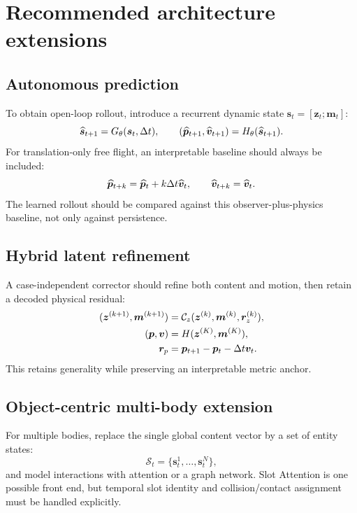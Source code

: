 \documentclass[11pt,a4paper]{article}
\begin{document}
\section{Recommended architecture extensions}
\subsection{Autonomous prediction}
To obtain open-loop rollout, introduce a recurrent dynamic state $\bm s_t=[\bm z_t;\bm m_t]$:
\begin{equation}
\widehat{\bm s}_{t+1}=G_\theta(\bm s_t,\Delta t),\qquad
(\widehat{\bm p}_{t+1},\widehat{\bm v}_{t+1})=H_\theta(\widehat{\bm s}_{t+1}).
\end{equation}
For translation-only free flight, an interpretable baseline should always be included:
\begin{equation}
\widehat{\bm p}_{t+k}=\widehat{\bm p}_t+k\Delta t\widehat{\bm v}_t,
\qquad \widehat{\bm v}_{t+k}=\widehat{\bm v}_t.
\end{equation}
The learned rollout should be compared against this observer-plus-physics baseline, not only against persistence.

\subsection{Hybrid latent refinement}
A case-independent corrector should refine both content and motion, then retain a decoded physical residual:
\begin{align}
(\bm z^{(k+1)},\bm m^{(k+1)})&=\mathcal C_z(\bm z^{(k)},\bm m^{(k)},\bm r_z^{(k)}),\\
(\bm p,\bm v)&=H(\bm z^{(K)},\bm m^{(K)}),\\
\bm r_p&=\bm p_{t+1}-\bm p_t-\Delta t\bm v_t.
\end{align}
This retains generality while preserving an interpretable metric anchor.

\subsection{Object-centric multi-body extension}
For multiple bodies, replace the single global content vector by a set of entity states:
\begin{equation}
\mathcal S_t=\{\bm s_t^1,\ldots,\bm s_t^N\},
\end{equation}
and model interactions with attention or a graph network. Slot Attention is one possible front end, but temporal slot identity and collision/contact assignment must be handled explicitly.
\end{document}
